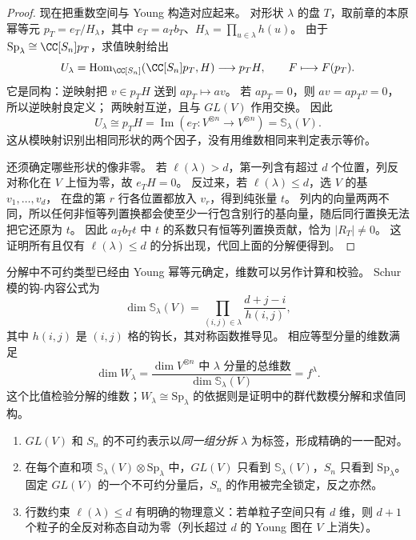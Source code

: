 \begin{proof}
现在把重数空间与 Young 构造对应起来。
对形状 $\lambda$ 的盘 $T$，取前章的本原幂等元
$p_T=e_T/H_\lambda$，其中 $e_T=a_Tb_T$、$H_\lambda=\prod_{u\in\lambda}h(u)$。
由于 $\mathrm{Sp}_\lambda\cong\CC[S_n]p_T$，求值映射给出
\[
U_\lambda=\operatorname{Hom}_{\CC[S_n]}(\CC[S_n]p_T,H)
\longrightarrow p_TH,\qquad F\longmapsto F(p_T).
\]
它是同构：逆映射把 $v\in p_TH$ 送到 $ap_T\mapsto av$。
若 $ap_T=0$，则 $av=ap_Tv=0$，所以逆映射良定义；
两映射互逆，且与 $GL(V)$ 作用交换。
因此
\[
U_\lambda\cong p_TH
=\operatorname{Im}(e_T:V^{\otimes n}\to V^{\otimes n})
=\mathbb S_\lambda(V).
\]
这从模映射识别出相同形状的两个因子，没有用维数相同来判定表示等价。

还须确定哪些形状的像非零。
若 $\ell(\lambda)>d$，第一列含有超过 $d$ 个位置，列反对称化在 $V$ 上恒为零，故 $e_TH=0$。
反过来，若 $\ell(\lambda)\le d$，选 $V$ 的基 $v_1,\ldots,v_d$，
在盘的第 $r$ 行各位置都放入 $v_r$，得到纯张量 $t$。
列内的向量两两不同，所以任何非恒等列置换都会使至少一行包含别行的基向量，随后同行置换无法把它还原为 $t$。
因此 $a_Tb_Tt$ 中 $t$ 的系数只有恒等列置换贡献，恰为 $|R_T|\ne0$。
这证明所有且仅有 $\ell(\lambda)\le d$ 的分拆出现，代回上面的分解便得到。
\end{proof}

分解中不可约类型已经由 Young 幂等元确定，维数可以另作计算和校验。
Schur 模的钩-内容公式为
\begin{equation}
\dim\mathbb{S}_\lambda(V)=\prod_{(i,j)\in\lambda}\frac{d+j-i}{h(i,j)},
\label{eq:hook-content-formula}
\end{equation}
其中 $h(i,j)$ 是 $(i,j)$ 格的钩长，其对称函数推导见。
相应等型分量的维数满足
\[
\dim W_\lambda=\frac{\dim V^{\otimes n}\text{ 中 }\lambda\text{ 分量的总维数}}{\dim\mathbb{S}_\lambda(V)}
=f^\lambda.
\]
这个比值检验分解的维数；$W_\lambda\cong\mathrm{Sp}_\lambda$ 的依据则是证明中的群代数模分解和求值同构。

\begin{enumerate}[label=(\roman*),leftmargin=3em]
\item $GL(V)$ 和 $S_n$ 的不可约表示以\emph{同一组分拆} $\lambda$ 为标签，形成精确的一一配对。
\item 在每个直和项 $\mathbb{S}_\lambda(V)\otimes\mathrm{Sp}_\lambda$ 中，$GL(V)$ 只看到 $\mathbb{S}_\lambda(V)$，$S_n$ 只看到 $\mathrm{Sp}_\lambda$。固定 $GL(V)$ 的一个不可约分量后，$S_n$ 的作用被完全锁定，反之亦然。
\item 行数约束 $\ell(\lambda)\le d$ 有明确的物理意义：若单粒子空间只有 $d$ 维，则 $d+1$ 个粒子的全反对称态自动为零（列长超过 $d$ 的 Young 图在 $V$ 上消失）。
\end{enumerate}

